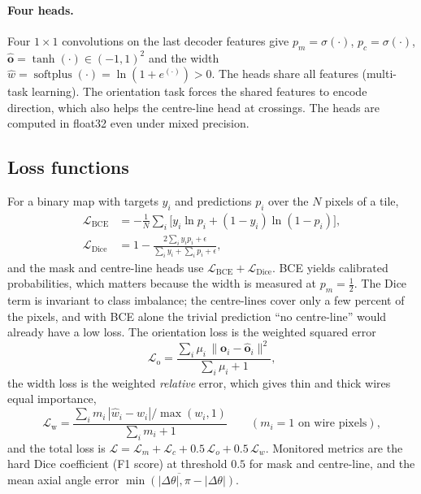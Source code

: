 \documentclass[11pt,a4paper]{article}
\begin{document}
\paragraph{Four heads.} Four $1\times1$ convolutions on the last decoder features give
$p_m=\sigma(\cdot)$, $p_c=\sigma(\cdot)$, $\hat{\mathbf o}=\tanh(\cdot)\in(-1,1)^2$ and the width $\hat w=\operatorname{softplus}(\cdot)=\ln(1+e^{(\cdot)})>0$. The heads share all features (multi-task learning). The orientation task forces the shared features to encode direction, which also helps the centre-line head at crossings. The heads are computed in float32 even under mixed precision.

\subsection{Loss functions}
For a binary map with targets $y_i$ and predictions $p_i$ over the $N$ pixels of a tile,
\begin{align}
\mathcal L_{\text{BCE}}&=-\frac1N\sum_i\bigl[y_i\ln p_i+(1-y_i)\ln(1-p_i)\bigr],\\
\mathcal L_{\text{Dice}}&=1-\frac{2\sum_i y_ip_i+\epsilon}{\sum_iy_i+\sum_ip_i+\epsilon},
\end{align}
and the mask and centre-line heads use $\mathcal L_{\text{BCE}}+\mathcal L_{\text{Dice}}$. BCE yields calibrated probabilities, which matters because the width is measured at $p_m=\tfrac12$. The Dice term is invariant to class imbalance; the centre-lines cover only a few percent of the pixels, and with BCE alone the trivial prediction ``no centre-line'' would already have a low loss. The orientation loss is the weighted squared error
\begin{equation}
\mathcal L_{\text{o}}=\frac{\sum_i\mu_i\,\|\mathbf o_i-\hat{\mathbf o}_i\|^2}{\sum_i\mu_i+1},
\end{equation}
the width loss is the weighted \emph{relative} error, which gives thin and thick wires equal importance,
\begin{equation}
\mathcal L_{\text{w}}=\frac{\sum_i m_i\,|\hat w_i-w_i|/\max(w_i,1)}{\sum_i m_i+1}\qquad(m_i=1\text{ on wire pixels}),
\end{equation}
and the total loss is $\mathcal L=\mathcal L_m+\mathcal L_c+0.5\,\mathcal L_o+0.5\,\mathcal L_w$. Monitored metrics are the hard Dice coefficient (F1 score) at threshold $0.5$ for mask and centre-line, and the mean axial angle error $\overline{\min(|\Delta\theta|,\pi-|\Delta\theta|)}$.

\end{document}

